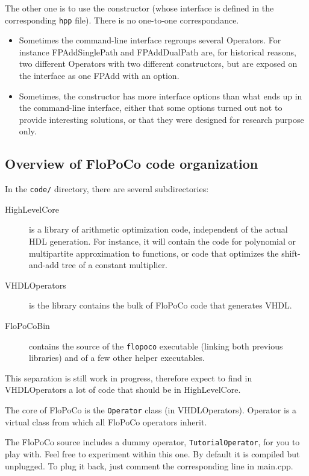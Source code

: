 \documentclass{article}
\begin{document}
The other one is to use the constructor (whose interface is defined in the corresponding \texttt{hpp} file).
There is no one-to-one correspondance.
\begin{itemize}
\item Sometimes the command-line interface regroups several Operators.
  For instance FPAddSinglePath and FPAddDualPath are, for historical reasons, two different Operators with two different constructors, but are exposed on the interface as one FPAdd with an option.
  
\item Sometimes, the constructor has more interface options than what ends up in the command-line interface, either that some options turned out not to provide interesting solutions, or that they were
  designed for research purpose only.
\end{itemize}
\fi


\subsection{Overview of FloPoCo code organization}

In the \texttt{code/} directory, there are several subdirectories:
\begin{description}
\item[HighLevelCore] is a library of arithmetic optimization code, independent of the actual HDL generation. For instance, it will contain the code for polynomial or multipartite approximation to functions, or code that optimizes the shift-and-add tree of a constant multiplier.   
\item[VHDLOperators] is the library contains the bulk of FloPoCo code that generates VHDL. 
\item[FloPoCoBin] contains the source of the \texttt{flopoco} executable (linking both previous libraries) and of a few other helper executables.
\end{description}
This separation is still work in progress, therefore expect to find in VHDLOperators a lot of code that should be in HighLevelCore.

The core of FloPoCo is the \texttt{Operator} class  (in VHDLOperators). 
Operator is a virtual class from which all FloPoCo operators inherit. 

The FloPoCo source includes a dummy operator, \texttt{TutorialOperator}, for you to play with. 
Feel free to experiment within this one. 
By default it is compiled but unplugged. To plug it back, just comment the corresponding line in main.cpp.
\end{document}
